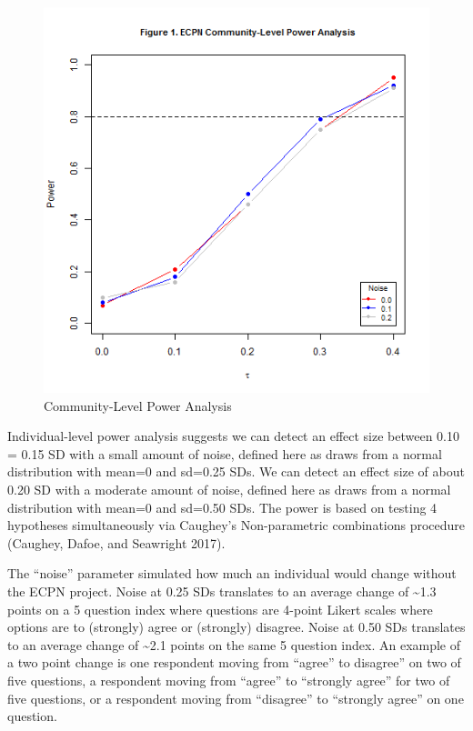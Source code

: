 \documentclass[
]{article}
\begin{document}
\begin{figure}
\centering
\includegraphics{../../../figures/ecpn_power_figure.png}
\caption{Community-Level Power Analysis}
\end{figure}

Individual-level power analysis suggests we can detect an effect size
between 0.10 = 0.15 SD with a small amount of noise, defined here as
draws from a normal distribution with mean=0 and sd=0.25 SDs. We can
detect an effect size of about 0.20 SD with a moderate amount of noise,
defined here as draws from a normal distribution with mean=0 and sd=0.50
SDs. The power is based on testing 4 hypotheses simultaneously via
Caughey's Non-parametric combinations procedure (Caughey, Dafoe, and
Seawright 2017).

The ``noise'' parameter simulated how much an individual would change
without the ECPN project. Noise at 0.25 SDs translates to an average
change of \textasciitilde1.3 points on a 5 question index where
questions are 4-point Likert scales where options are to (strongly)
agree or (strongly) disagree. Noise at 0.50 SDs translates to an average
change of \textasciitilde2.1 points on the same 5 question index. An
example of a two point change is one respondent moving from ``agree'' to
disagree'' on two of five questions, a respondent moving from ``agree''
to ``strongly agree'' for two of five questions, or a respondent moving
from ``disagree'' to ``strongly agree'' on one question.
\end{document}
